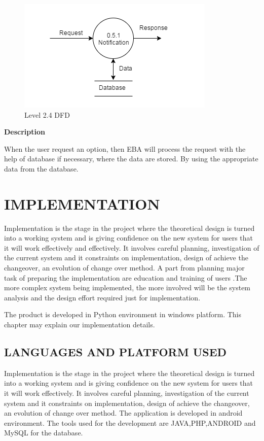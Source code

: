 \documentclass[12pt,a4paper,oneside]{report}
\begin{document}
       \begin{figure}[h]
               	\begin{center}
               		\includegraphics[scale=1.2]{level24.png}
               			\caption{Level 2.4 DFD}
               			\label{Level 2 DFD}
               	\end{center}
               \end{figure}         
        \textbf{Description}
        \par When the user request an option, then EBA will process the request with the help of
        database if necessary, where the data are stored. By using the appropriate data from the database.
 \chapter{IMPLEMENTATION}
 \par Implementation is the stage in the project where the theoretical design is turned into a working system and is giving confidence on the new system for users that it will work effectively and effectively. It involves careful planning, investigation of the current system and it constraints on implementation, design of achieve the changeover, an evolution of change over method. A part from planning major task of preparing the implementation are education and training of users .The more complex system being implemented, the more involved will be the system analysis and the design effort required just for implementation.\\
 \par  The product is developed in Python environment in windows platform. This chapter may explain our implementation details.\\
 \section{ LANGUAGES AND PLATFORM USED}
\par Implementation is the stage in the project where the theoretical design is turned into a
working system and is giving confidence on the new system for users that it will work effectively.
It involves careful planning, investigation of the current system and it constraints
on implementation, design of achieve the changeover, an evolution of change over method.
The application is developed in android environment. The tools used for the development are
JAVA,PHP,ANDROID and MySQL for the database.\\
\end{document}
